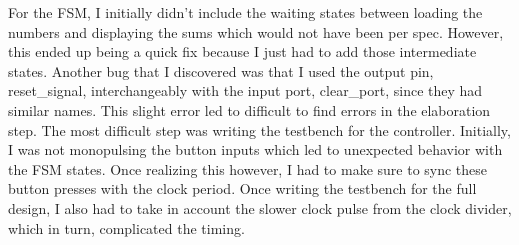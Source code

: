 \documentclass[10pt]{article}
\begin{document}
For the FSM, I initially didn't include the waiting states between loading the numbers and displaying the sums which would not have been per spec.
However, this ended up being a quick fix because I just had to add those intermediate states.
Another bug that I discovered was that I used the output pin, reset\_signal, interchangeably with the input port, clear\_port, since they had similar names.
This slight error led to difficult to find errors in the elaboration step. 
The most difficult step was writing the testbench for the controller.
Initially, I was not monopulsing the button inputs which led to unexpected behavior with the FSM states.
Once realizing this however, I had to make sure to sync these button presses with the clock period.
Once writing the testbench for the full design, I also had to take in account the slower clock pulse from the clock divider, which in turn, complicated the timing.
\end{document}

